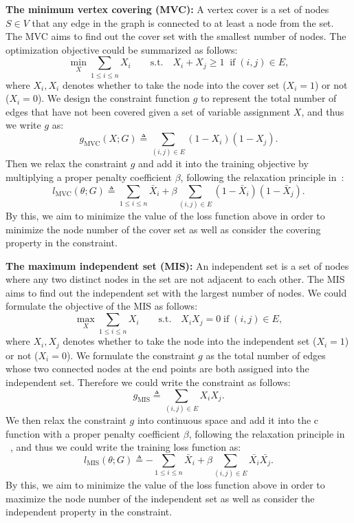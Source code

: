 \textbf{The minimum vertex covering (MVC):} A vertex cover is a set of nodes $S\in V$ that any edge in the graph is connected to at least a node from the set. The MVC aims to find out the cover set with the smallest number of nodes. The optimization objective could be summarized as follows:
\begin{equation}
    \min_{X} \sum_{1 \leq i \leq n} X_i \quad \quad \text{s.t.} \quad  X_i + X_j \geq 1\;\;\text{if}\;(i,j)\in E,
\end{equation}where $X_i,X_i$ denotes whether to take the node into the cover set ($X_i = 1$) or not ($X_i=0$). We design the constraint function $g$ to represent the total number of edges that have not been covered given a set of variable assignment $X$, and thus we write $g$ as:
\begin{equation}
    g_{\text{MVC}}(X;G) \triangleq \sum_{(i,j) \in E} (1-X_i) (1-X_j).
\end{equation}
Then we relax the constraint $g$ and add it into the training objective by multiplying a proper penalty coefficient $\beta$, following the relaxation principle in~\cite{wang2022unsupervised}:
\begin{equation}
    l_{\text{MVC}}(\theta;G) \triangleq \sum_{1\leq i \leq n} \bar{X}_i +\beta \sum_{(i,j) \in E} (1-\bar{X}_i) (1-\bar{X}_j).
\end{equation}
By this, we aim to minimize the value of the loss function above in order to minimize the node number of the cover set as well as consider the covering property in the constraint.


\textbf{The maximum independent set (MIS):} An independent set is a set of nodes where any two distinct nodes in the set are not adjacent to each other. The MIS aims to find out the independent set with the largest number of nodes. We could formulate the objective of the MIS as follows:
\begin{equation}
    \max_{X} \sum_{1 \leq i \leq n} X_i \quad \quad \text{s.t.} \quad  X_iX_j = 0 \;\text{if}\; (i,j) \in E,
\end{equation}where $X_i, X_j$ denotes whether to take the node into the independent set ($X_i = 1$) or not ($X_i = 0$). We formulate the constraint $g$ as the total number of edges whose two connected nodes at the end points are both assigned into the independent set. Therefore we could write the constraint as follows:
\begin{equation}
    g_{\text{MIS}} \triangleq \sum_{(i,j) \in E} X_i X_j.
\end{equation}
We then relax the constraint $g$ into continuous space and add it into the c function with a proper penalty coefficient $\beta$, following the relaxation principle in ~\citep{wang2022unsupervised}, and thus we could write the training loss function as:
\begin{equation}
    l_{\text{MIS}}(\theta;G) \triangleq -\sum_{1 \leq i \leq n} \bar{X}_i + \beta \sum_{(i,j) \in E} \bar{X_i} \bar{X_j}.
\end{equation}
By this, we aim to minimize the value of the loss function above in order to maximize the node number of the independent set as well as consider the independent property in the constraint.

